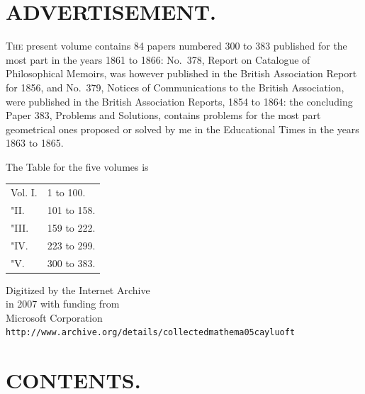 \documentclass[11pt,a4paper]{article}
\begin{document}
\setcounter{page}{5}
\section*{ADVERTISEMENT.}

\textsc{The} present volume contains 84 papers numbered 300 to 383 published for the most part in the years 1861 to 1866: No.~378, Report on Catalogue of Philosophical Memoirs, was however published in the British Association Report for 1856, and No.~379, Notices of Communications to the British Association, were published in the British Association Reports, 1854 to 1864: the concluding Paper 383, Problems and Solutions, contains problems for the most part geometrical ones proposed or solved by me in the Educational Times in the years 1863 to 1865.

The Table for the five volumes is
\begin{center}
\begin{tabular}{l@{ Numbers }l}
Vol. I. & 1 to 100. \\
"\quad II. & 101 to 158. \\
"\quad III. & 159 to 222. \\
"\quad IV. & 223 to 299. \\
"\quad V. & 300 to 383.
\end{tabular}
\end{center}
\clearpage

\thispagestyle{empty}
\begin{center}
\vspace*{3in}
Digitized by the Internet Archive\\[0.5em]
in 2007 with funding from\\[0.5em]
Microsoft Corporation\\[1em]
\texttt{http://www.archive.org/details/collectedmathema05cayluoft}
\end{center}
\clearpage

\setcounter{page}{7}
\section*{CONTENTS.}
\end{document}
